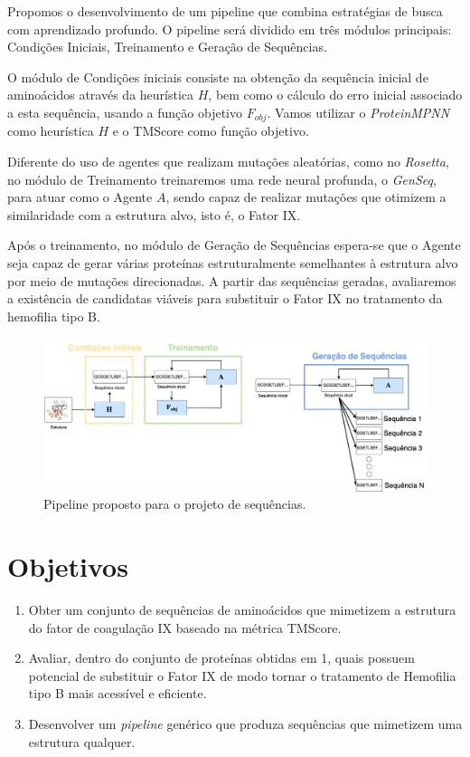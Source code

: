 Propomos o desenvolvimento de um pipeline que combina estratégias de busca com aprendizado profundo. 
O pipeline será dividido em três módulos principais: Condições Iniciais, Treinamento e Geração de Sequências.

O módulo de Condições iniciais consiste na obtenção da sequência inicial de aminoácidos através da heurística $H$,
bem como o cálculo do erro inicial associado a esta sequência, usando a função objetivo $F_{obj}$. 
Vamos utilizar o \textit{ProteinMPNN} como heurística $H$ e o TMScore como função objetivo.

Diferente do uso de agentes que realizam mutações aleatórias, como no \textit{Rosetta},
no módulo de Treinamento treinaremos uma rede neural profunda, o \textit{GenSeq}, para atuar como o Agente $A$,
sendo capaz de realizar mutações que otimizem a similaridade com a estrutura alvo, isto é, o Fator IX.

Após o treinamento, no módulo de Geração de Sequências
espera-se que o Agente seja capaz de gerar várias proteínas estruturalmente semelhantes à estrutura alvo por meio de mutações direcionadas. 
A partir das sequências geradas, avaliaremos a existência de candidatas viáveis para substituir o Fator IX no tratamento da hemofilia tipo B.


\begin{figure}[H]
  \centering
  \includegraphics[width=.8\textwidth]{figuras/metodologia-pipeline_proposta.jpg}
  \caption{Pipeline proposto para o projeto de sequências.}
  \label{fig:proposta}
\end{figure}

\section{Objetivos}

\begin{enumerate}
  \item Obter um conjunto de sequências de aminoácidos que mimetizem a estrutura do fator de coagulação IX baseado na métrica TMScore.
  \item Avaliar, dentro do conjunto de proteínas obtidas em 1, quais possuem potencial de substituir o Fator IX de modo tornar o tratamento de Hemofilia tipo B mais acessível e eficiente.
  \item Desenvolver um \textit{pipeline} genérico que produza sequências que mimetizem uma estrutura qualquer.
\end{enumerate}
